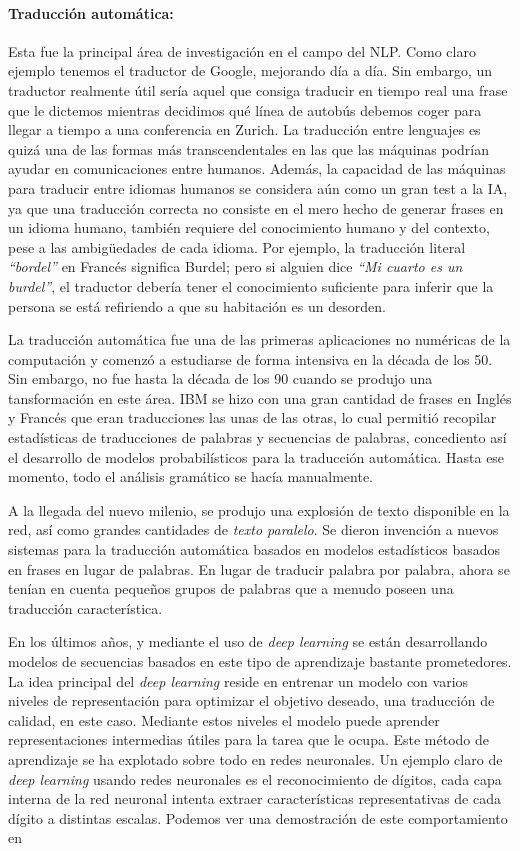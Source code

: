 \paragraph{Traducción automática:} Esta fue la principal área de investigación
en el campo del \ac{NLP}. Como claro ejemplo tenemos el traductor de Google,
mejorando día a día. Sin embargo, un traductor realmente útil sería aquel que
consiga traducir en tiempo real una frase que le dictemos mientras decidimos qué
línea de autobús debemos coger para llegar a tiempo a una conferencia en
Zurich. La traducción entre lenguajes es quizá una de las formas más
transcendentales en las que las máquinas podrían ayudar en comunicaciones entre
humanos. Además, la capacidad de las máquinas para traducir entre idiomas
humanos se considera aún como un gran test a la \ac{IA}, ya que una traducción
correcta no consiste en el mero hecho de generar frases en un idioma humano,
también requiere del conocimiento humano y del contexto, pese a las ambigüedades
de cada idioma. Por ejemplo, la traducción literal \emph{``bordel''} en Francés
significa Burdel; pero si alguien dice \emph{``Mi cuarto es un burdel''}, el
traductor debería tener el conocimiento suficiente para inferir que la persona
se está refiriendo a que su habitación es un desorden.

La traducción automática fue una de las primeras aplicaciones no numéricas de la
computación y comenzó a estudiarse de forma intensiva en la década de los
50. Sin embargo, no fue hasta la década de los 90 cuando se produjo una
tansformación en este área. IBM se hizo con una gran cantidad de frases en
Inglés y Francés que eran traducciones las unas de las otras,  lo cual permitió recopilar estadísticas de traducciones de
palabras y secuencias de palabras, concediento así el desarrollo de modelos
probabilísticos para la traducción automática. Hasta ese momento, todo el
análisis gramático se hacía manualmente.

A la llegada del nuevo milenio, se produjo una explosión de texto disponible en
la red, así como grandes cantidades de \emph{texto paralelo}. Se dieron
invención a nuevos sistemas para la traducción automática basados en modelos
estadísticos basados en frases en lugar de palabras. En lugar de traducir
palabra por palabra, ahora se tenían en cuenta pequeños grupos de palabras que a
menudo poseen una traducción característica.

En los últimos años, y mediante el uso de \emph{deep learning} se están
desarrollando modelos de secuencias basados en este tipo de aprendizaje bastante
prometedores. La idea principal del \emph{deep learning} reside en entrenar un
modelo con varios niveles de representación para optimizar el objetivo deseado,
una traducción de calidad, en este caso. Mediante estos niveles el modelo puede
aprender representaciones intermedias útiles para la tarea que le ocupa. Este
método de aprendizaje se ha explotado sobre todo en redes neuronales. Un ejemplo
claro de \emph{deep learning} usando redes neuronales es el reconocimiento de
dígitos, cada capa interna de la red neuronal intenta extraer características
representativas de cada dígito a distintas escalas. Podemos ver una demostración
de este comportamiento en \citet{computerPhile:nn}

